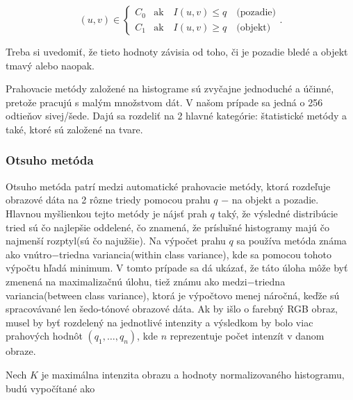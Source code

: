 \documentclass[a4paper,12pt,twoside]{article}%
\begin{document}
\begin{equation}
(u, v) \in \begin{cases} C_0 & \text{ak} \hspace{1em} I(u,v) \leq q \hspace{1em} \text{(pozadie)} \\  C_1 & \text{ak} \hspace{1em} I(u,v) \geq q \hspace{1em} \text{(objekt)} \end{cases}.
\end{equation}

Treba si uvedomiť, že tieto hodnoty závisia od toho, či je pozadie bledé a objekt tmavý alebo naopak.

Prahovacie metódy založené na histograme sú zvyčajne jednoduché a účinné, pretože pracujú s malým množstvom dát. V našom prípade sa jedná o 256 odtieňov sivej/šede. Dajú sa rozdeliť na 2 hlavné kategórie: štatistické metódy a také, ktoré sú založené na tvare.


\subsubsection{Otsuho metóda} \label{OtsuM}
Otsuho metóda patrí medzi automatické  prahovacie metódy, ktorá rozdeľuje obrazové dáta na 2 rôzne triedy pomocou prahu $q$ $-$ na objekt a pozadie. Hlavnou myšlienkou tejto metódy je nájsť prah $q$ taký, že výsledné distribúcie tried sú čo najlepšie oddelené, čo znamená, že príslušné histogramy majú čo najmenší rozptyl(sú čo najužšie). Na výpočet prahu $q$ sa používa metóda známa ako vnútro$-$triedna variancia(within class variance), kde sa pomocou tohoto výpočtu hľadá minimum. V tomto prípade sa dá ukázať, že táto úloha môže byť zmenená na maximalizačnú úlohu, tiež známu ako medzi$-$triedna variancia(between class variance), ktorá je výpočtovo menej náročná, keďže sú spracovávané len šedo-tónové obrazové dáta. Ak by išlo o farebný RGB obraz, musel by byť rozdelený na jednotlivé intenzity a výsledkom by bolo viac prahových hodnôt $(q_1, \ldots, q_n)$, kde $n$ reprezentuje počet intenzít v danom obraze.

Nech $K$ je maximálna intenzita obrazu a hodnoty normalizovaného histogramu, budú vypočítané ako
\end{document}
